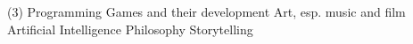 



\begin{cventries}


\begin{tasks}[style=itemize, label-align=left, item-indent={10mm}](3)%
\task Programming
\task Games and their development
\task Art, esp. music and film
\task Artificial Intelligence
\task Philosophy
\task Storytelling
\end{tasks}

%



\end{cventries}
